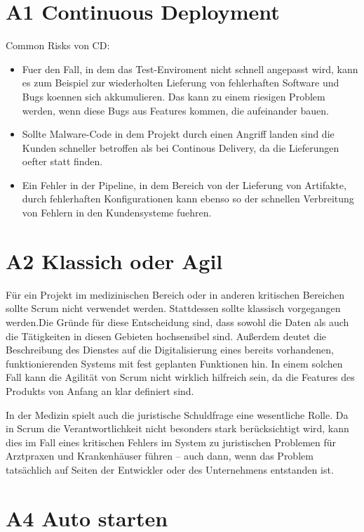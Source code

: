 \documentclass[12pt]{article}
\begin{document}
\section*{A1 Continuous Deployment}

Common Risks von CD: 

\begin{itemize}
  
  \item Fuer den Fall, in dem das Test-Enviroment nicht schnell angepasst wird, kann es zum Beispiel zur wiederholten Lieferung 
  von fehlerhaften Software und Bugs koennen sich akkumulieren. Das kann zu einem riesigen Problem werden, wenn diese Bugs aus Features kommen, die 
  aufeinander bauen. 
  
  \item Sollte Malware-Code in dem Projekt durch einen Angriff landen sind die Kunden schneller betroffen als bei Continous Delivery, da 
  die Lieferungen oefter statt finden.

  \item Ein Fehler in der Pipeline, in dem Bereich von der Lieferung von Artifakte, durch fehlerhaften Konfigurationen kann ebenso so 
    der schnellen Verbreitung von Fehlern in den Kundensysteme fuehren.

\end{itemize}

\section*{A2 Klassich oder Agil}

Für ein Projekt im medizinischen Bereich oder in anderen kritischen Bereichen sollte Scrum nicht verwendet werden. Stattdessen sollte klassisch 
vorgegangen werden.Die Gründe für diese Entscheidung sind, dass sowohl die Daten als auch die Tätigkeiten in diesen Gebieten 
hochsensibel sind. Außerdem deutet die Beschreibung des Dienstes auf die Digitalisierung eines bereits vorhandenen, funktionierenden Systems mit fest geplanten Funktionen hin. 
In einem solchen Fall kann die Agilität von Scrum nicht wirklich hilfreich sein, da die Features des Produkts von Anfang an klar definiert sind.

In der Medizin spielt auch die juristische Schuldfrage eine wesentliche Rolle. Da in Scrum die Verantwortlichkeit nicht besonders stark berücksichtigt wird, kann dies im 
Fall eines kritischen Fehlers im System zu juristischen Problemen für Arztpraxen und Krankenhäuser führen – auch dann, wenn das Problem tatsächlich auf Seiten der Entwickler oder des 
Unternehmens entstanden ist.

\section*{A4 Auto starten}
\end{document}
